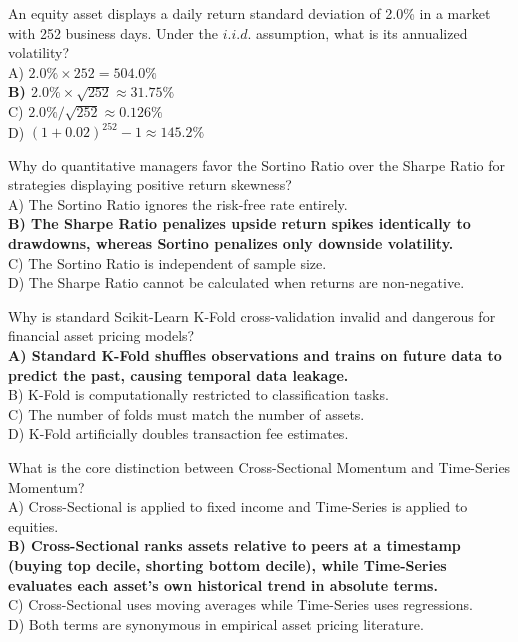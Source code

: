 \documentclass[11pt,a4paper]{article}
\begin{document}
\begin{infobox}
An equity asset displays a daily return standard deviation of 2.0\% in a market with 252 business days. Under the $i.i.d.$ assumption, what is its annualized volatility?\\
A) $2.0\% \times 252 = 504.0\%$\\
\textbf{B) $2.0\% \times \sqrt{252} \approx 31.75\%$}\\
C) $2.0\% / \sqrt{252} \approx 0.126\%$\\
D) $(1 + 0.02)^{252} - 1 \approx 145.2\%$
\end{infobox}

\begin{infobox}
Why do quantitative managers favor the Sortino Ratio over the Sharpe Ratio for strategies displaying positive return skewness?\\
A) The Sortino Ratio ignores the risk-free rate entirely.\\
\textbf{B) The Sharpe Ratio penalizes upside return spikes identically to drawdowns, whereas Sortino penalizes only downside volatility.}\\
C) The Sortino Ratio is independent of sample size.\\
D) The Sharpe Ratio cannot be calculated when returns are non-negative.
\end{infobox}

\begin{infobox}
Why is standard Scikit-Learn K-Fold cross-validation invalid and dangerous for financial asset pricing models?\\
\textbf{A) Standard K-Fold shuffles observations and trains on future data to predict the past, causing temporal data leakage.}\\
B) K-Fold is computationally restricted to classification tasks.\\
C) The number of folds must match the number of assets.\\
D) K-Fold artificially doubles transaction fee estimates.
\end{infobox}

\begin{infobox}
What is the core distinction between Cross-Sectional Momentum and Time-Series Momentum?\\
A) Cross-Sectional is applied to fixed income and Time-Series is applied to equities.\\
\textbf{B) Cross-Sectional ranks assets relative to peers at a timestamp (buying top decile, shorting bottom decile), while Time-Series evaluates each asset's own historical trend in absolute terms.}\\
C) Cross-Sectional uses moving averages while Time-Series uses regressions.\\
D) Both terms are synonymous in empirical asset pricing literature.
\end{infobox}
\end{document}
